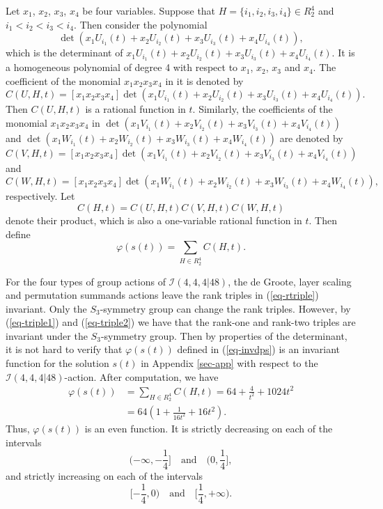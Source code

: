 \documentclass[reqno]{amsart}
\theoremstyle{definition}
\numberwithin{equation}{section}
\theoremstyle{remark}
\begin{document}
Let $x_1$, $x_2$, $x_3$, $x_4$ be four variables.
Suppose that $H=\{i_1,i_2,i_3,i_4\}\in R_2^4$ and $i_1<i_2<i_3<i_4$. Then consider the polynomial
\begin{equation*}
\det\left(x_1 U_{i_1}(t)+x_2 U_{i_2}(t)+x_3 U_{i_3}(t)+x_4 U_{i_4}(t)\right),
\end{equation*}
which is the determinant of $x_1 U_{i_1}(t)+x_2 U_{i_2}(t)+x_3 U_{i_3}(t)+x_4 U_{i_4}(t)$. It is a homogeneous polynomial of degree 4 with respect to $x_1$, $x_2$, $x_3$ and $x_4$.
The coefficient of the monomial $x_1x_2x_3x_4$ in it is denoted by
$$C(U,H,t)=[x_1x_2x_3x_4]
\det(x_1 U_{i_1}(t)+x_2 U_{i_2}(t)+x_3 U_{i_3}(t)+x_4 U_{i_4}(t)).$$
Then $C(U,H,t)$ is a rational function in $t$.
Similarly, the coefficients of the monomial $x_1x_2x_3x_4$ in
$\det(x_1 V_{i_1}(t)+x_2 V_{i_2}(t)+x_3 V_{i_3}(t)+x_4 V_{i_4}(t))$ 
and $\det(x_1 W_{i_1}(t)+x_2 W_{i_2}(t)+x_3 W_{i_3}(t)+x_4 W_{i_4}(t))$ are 
denoted by
$$C(V,H,t)=[x_1x_2x_3x_4]
\det(x_1 V_{i_1}(t)+x_2 V_{i_2}(t)+x_3 V_{i_3}(t)+x_4 V_{i_4}(t))$$
and
$$C(W,H,t)=[x_1x_2x_3x_4]
\det(x_1 W_{i_1}(t)+x_2 W_{i_2}(t)+x_3 W_{i_3}(t)+x_4 W_{i_4}(t)),$$
respectively.
Let
$$C(H,t)=C(U,H,t)C(V,H,t)C(W,H,t)$$
denote their product, which is also a one-variable rational function in $t$.
Then define
\begin{equation}\label{eq-invdps}
\varphi (s(t))=\sum_{H\in R_2^4} C(H,t).
\end{equation}

For the four types of group actions of $\mathcal{I}(4,4,4|48)$, the de Groote, layer scaling and permutation summands actions leave the rank triples in (\ref{eq-rtriple}) invariant. Only the $S_3$-symmetry group can change the rank triples. However, by (\ref{eq-triple1}) and (\ref{eq-triple2}) we have that the rank-one  and rank-two triples are invariant under the $S_3$-symmetry group. Then by properties of the determinant, it is not hard to verify that  $\varphi (s(t))$ defined in (\ref{eq-invdps}) is an invariant function for the solution $s(t)$ in Appendix \ref{sec-app} with respect to the $\mathcal{I}(4,4,4|48)$-action.
After computation, we have
\begin{align*}
   \varphi (s(t))&=\sum_{H\in R_2^4} C(H,t)=64+\frac{4}{t^2}+1024 t^2  \\
                 &= 64\left(1+\frac{1}{16t^2}+16t^2\right).
\end{align*}
Thus, $\varphi (s(t))$ is an even function.
It is strictly decreasing  on each of the intervals
$$(-\infty, -\frac{1}{4}]\quad\text{and}\quad(0,\frac{1}{4}],$$
and strictly increasing on each of the intervals
$$[-\frac{1}{4},0)\quad\text{and}\quad[\frac{1}{4},+\infty).$$
\end{document}
